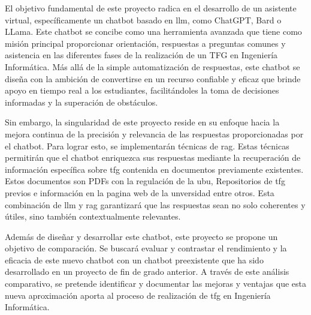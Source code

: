 
El objetivo fundamental de este proyecto radica en el desarrollo de un asistente virtual, específicamente un chatbot basado en \acrfull{llm}, como ChatGPT, Bard o LLama. Este chatbot se concibe como una herramienta avanzada que tiene como misión principal proporcionar orientación, respuestas a preguntas comunes y asistencia en las diferentes fases de la realización de un TFG en Ingeniería Informática. Más allá de la simple automatización de respuestas, este chatbot se diseña con la ambición de convertirse en un recurso confiable y eficaz que brinde apoyo en tiempo real a los estudiantes, facilitándoles la toma de decisiones informadas y la superación de obstáculos.

Sin embargo, la singularidad de este proyecto reside en su enfoque hacia la mejora continua de la precisión y relevancia de las respuestas proporcionadas por el chatbot. Para lograr esto, se implementarán técnicas de \acrfull{rag}. Estas técnicas permitirán que el chatbot enriquezca sus respuestas mediante la recuperación de información específica sobre \acrshort{tfg} contenida en documentos previamente existentes. Estos documentos son PDFs con la regulación de la \acrshort{ubu}, Repositorios de \acrshort{tfg} previos e información en la pagina web de la unversidad entre otros. Esta combinación de \acrshort{llm} y \acrshort{rag} garantizará que las respuestas sean no solo coherentes y útiles, sino también contextualmente relevantes.

Además de diseñar y desarrollar este chatbot, este proyecto se propone un objetivo de comparación. Se buscará evaluar y contrastar el rendimiento y la eficacia de este nuevo chatbot con un chatbot preexistente que ha sido desarrollado en un proyecto de fin de grado anterior. A través de este análisis comparativo, se pretende identificar y documentar las mejoras y ventajas que esta nueva aproximación aporta al proceso de realización de \acrshort{tfg} en Ingeniería Informática.

